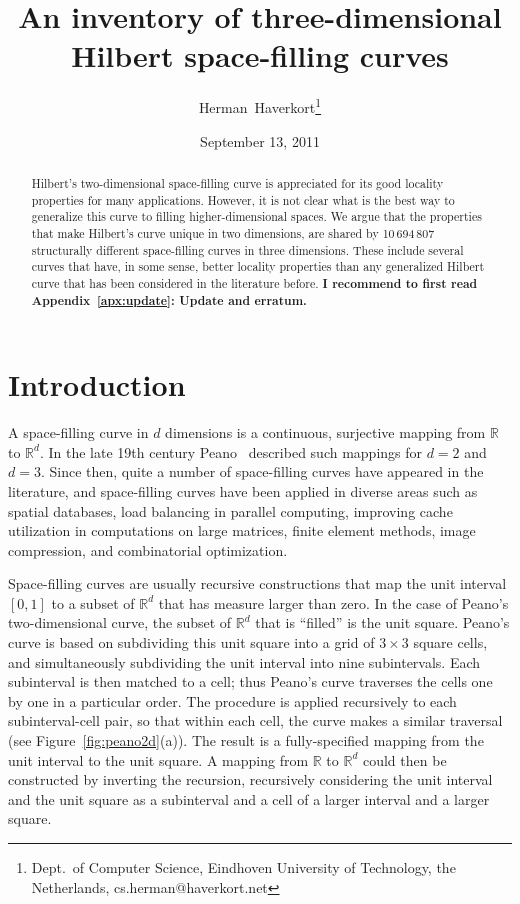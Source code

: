 \documentclass[11pt,a4paper]{article}
\newcommand{\Reals}{\mathbb{R}}
\begin{document}
\title{An inventory of three-dimensional Hilbert space-filling curves}
\author{Herman~Haverkort\thanks{Dept.\ of Computer Science, Eindhoven University of Technology, the Netherlands, cs.herman@haverkort.net}
}
\date{September 13, 2011}
\maketitle

\begin{abstract}
Hilbert's two-dimensional space-filling curve is appreciated for its good locality properties for many applications. However, it is not clear what is the best way to generalize this curve to filling higher-dimensional spaces. We argue that the properties that make Hilbert's curve unique in two dimensions, are shared by 10\,694\,807 structurally different space-filling curves in three dimensions. These include several curves that have, in some sense, better locality properties than any generalized Hilbert curve that has been considered in the literature before.
\textbf{I recommend to first read Appendix~\ref{apx:update}: Update and erratum.}
\end{abstract}

\section{Introduction}
A space-filling curve in $d$ dimensions is a continuous, surjective mapping from $\Reals$ to $\Reals^d$.
In the late 19th century Peano~\cite{Peano} described such mappings for $d = 2$ and $d = 3$. Since then, quite a number of space-filling curves have appeared in the literature, and space-filling curves have been applied in diverse areas such as spatial databases, load balancing in parallel computing, improving cache utilization in computations on large matrices, finite element methods, image compression, and combinatorial optimization.

Space-filling curves are usually recursive constructions that map the unit interval $[0,1]$ to a subset of $\Reals^d$ that has measure larger than zero. In the case of Peano's two-dimensional curve, the subset of $\Reals^d$ that is ``filled'' is the unit square. Peano's curve is based on subdividing this unit square into a grid of $3 \times 3$ square cells, and simultaneously subdividing the unit interval into nine subintervals. Each subinterval is then matched to a cell; thus Peano's curve traverses the cells one by one in a particular order. The procedure is applied recursively to each subinterval-cell pair, so that within each cell, the curve makes a similar traversal (see Figure~\ref{fig:peano2d}(a)). The result is a fully-specified mapping from the unit interval to the unit square. A mapping from $\Reals$ to $\Reals^d$ could then be constructed by inverting the recursion, recursively considering the unit interval and the unit square as a subinterval and a cell of a larger interval and a larger square.
\end{document}
